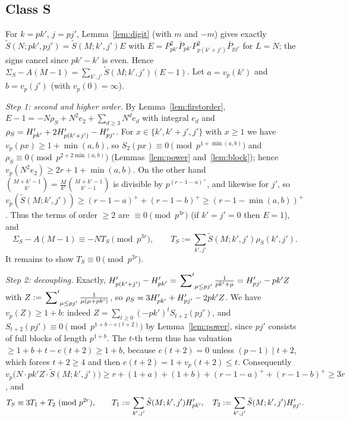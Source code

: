 \documentclass[11pt]{amsart}
\begin{document}
\subsection{Class S}
For $k=pk'$, $j=pj'$, Lemma~\ref{lem:digit} (with $m$ and $-m$) gives exactly $\tilde S(N;pk',pj')=\tilde S(M;k',j')E$ with $E=P_{pk'}^2\bar P_{pk'}P_{p(k'+j')}^2\bar P_{pj'}$ for $L=N$; the signs cancel since $pk'-k'$ is even. Hence $\Sigma_S-A(M-1)=\sum_{k',j'}\tilde S(M;k',j')(E-1)$. Let $a=v_p(k')$ and $b=v_p(j')$ (with $v_p(0)=\infty$).

\emph{Step 1: second and higher order.} By Lemma~\ref{lem:firstorder}, $E-1=-N\rho_S+N^2e_2+\sum_{d\ge3}N^de_d$ with integral $e_d$ and $\rho_S=H'_{pk'}+2H'_{p(k'+j')}-H'_{pj'}$. For $x\in\{k',k'+j',j'\}$ with $x\ge1$ we have $v_p(px)\ge1+\min(a,b)$, so $S_2(px)\equiv0\pmod{p^{1+\min(a,b)}}$ and $\rho_S\equiv0\pmod{p^{2+2\min(a,b)}}$ (Lemmas~\ref{lem:power} and~\ref{lem:block}); hence $v_p(N^2e_2)\ge2r+1+\min(a,b)$. On the other hand $\binom{M+k'-1}{k'}=\frac M{k'}\binom{M+k'-1}{k'-1}$ is divisible by $p^{(r-1-a)^+}$, and likewise for $j'$, so $v_p(\tilde S(M;k',j'))\ge(r-1-a)^++(r-1-b)^+\ge(r-1-\min(a,b))^+$. Thus the terms of order $\ge2$ are $\equiv0\pmod{p^{3r}}$ (if $k'=j'=0$ then $E=1$), and
\[ \Sigma_S-A(M-1)\equiv-NT_S\pmod{p^{3r}},\qquad T_S:=\sum_{k',j'}\tilde S(M;k',j')\rho_S(k',j'). \]
It remains to show $T_S\equiv0\pmod{p^{2r}}$.

\emph{Step 2: decoupling.} Exactly, $H'_{p(k'+j')}-H'_{pk'}=\sideset{}{'}\sum_{\mu\le pj'}\frac1{pk'+\mu}=H'_{pj'}-pk'Z$ with $Z:=\sideset{}{'}\sum_{\mu\le pj'}\frac1{\mu(\mu+pk')}$, so $\rho_S=3H'_{pk'}+H'_{pj'}-2pk'Z$. We have $v_p(Z)\ge1+b$: indeed $Z=\sum_{t\ge0}(-pk')^tS_{t+2}(pj')$, and $S_{t+2}(pj')\equiv0\pmod{p^{1+b-e(t+2)}}$ by Lemma~\ref{lem:power}, since $pj'$ consists of full blocks of length $p^{1+b}$. The $t$-th term thus has valuation $\ge1+b+t-e(t+2)\ge1+b$, because $e(t+2)=0$ unless $(p-1)\mid t+2$, which forces $t+2\ge4$ and then $e(t+2)=1+v_p(t+2)\le t$. Consequently $v_p\bigl(N\cdot pk'Z\cdot\tilde S(M;k',j')\bigr)\ge r+(1+a)+(1+b)+(r-1-a)^++(r-1-b)^+\ge3r$, and
\[ T_S\equiv3T_1+T_2\ (\mathrm{mod}\ p^{2r}),\qquad T_1:=\sum_{k',j'}\tilde S(M;k',j')H'_{pk'},\quad T_2:=\sum_{k',j'}\tilde S(M;k',j')H'_{pj'}. \]
\end{document}
